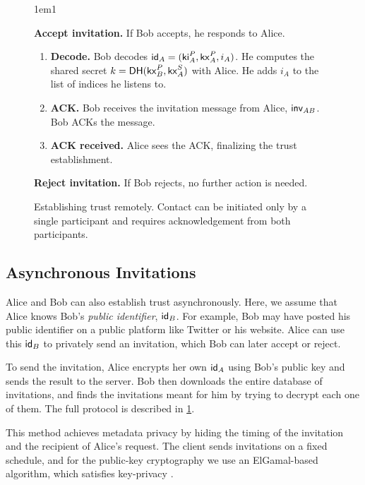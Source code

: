 \begin{figure}[th!]
\begin{framed}
{\begin{hangparas}{1em}{1}
    \medskip

      \textbf{Accept invitation.}
          If Bob accepts, he responds to Alice.
          \begin{enumerate}
              \item \textbf{Decode.} Bob decodes $\mathsf{id}_A = (\mathsf{ki}_A^P, \mathsf{kx}_A^P, i_A)$. He computes the shared secret $k =  \mathsf{DH}(\mathsf{kx}_B^P, \mathsf{kx}^S_A)$ with Alice. He adds $i_A$ to the list of indices he listens to.
              \item \textbf{ACK.} Bob receives the invitation message from Alice, $\mathsf{inv}_{AB}$. Bob ACKs the message.
              \item \textbf{ACK received.} Alice sees the ACK, finalizing the trust establishment.
          \end{enumerate}
    \medskip
          
      \textbf{Reject invitation.}
        If Bob rejects, no further action is needed.
  \end{hangparas}
  }
  \end{framed}
  \caption{Establishing trust remotely. Contact can be initiated only by a single participant and requires acknowledgement from both participants.}
  \label{fig:trust-establishment-async}
\end{figure}


\subsection{Asynchronous Invitations}

Alice and Bob can also establish trust asynchronously. Here, we assume that Alice knows Bob's \textit{public identifier}, $\mathsf{id}_B$. For example, Bob may have posted his public identifier on a public platform like Twitter or his website. Alice can use this $\mathsf{id}_B$ to privately send an invitation, which Bob can later accept or reject. 

To send the invitation, Alice encrypts her own $\mathsf{id}_A$ using Bob's public key and sends the result to the server. Bob then downloads the entire database of invitations, and finds the invitations meant for him by trying to decrypt each one of them. The full protocol is described in \cref{fig:trust-establishment-async}.

This method achieves metadata privacy by hiding the timing of the invitation and the recipient of Alice's request. The client sends invitations on a fixed schedule, and for the public-key cryptography we use an ElGamal-based algorithm, which satisfies key-privacy \cite{bellare2001key}.
    
